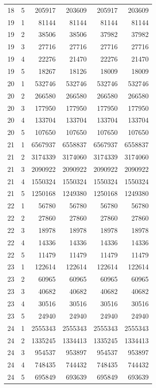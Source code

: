 \begin{longtable}{rrrrrr}
18 & 5 & 205917 & 203609 & 205917 & 203609 \\
19 & 1 & 81144 & 81144 & 81144 & 81144 \\
19 & 2 & 38506 & 38506 & 37982 & 37982 \\
19 & 3 & 27716 & 27716 & 27716 & 27716 \\
19 & 4 & 22276 & 21470 & 22276 & 21470 \\
19 & 5 & 18267 & 18126 & 18009 & 18009 \\
20 & 1 & 532746 & 532746 & 532746 & 532746 \\
20 & 2 & 266580 & 266580 & 266580 & 266580 \\
20 & 3 & 177950 & 177950 & 177950 & 177950 \\
20 & 4 & 133704 & 133704 & 133704 & 133704 \\
20 & 5 & 107650 & 107650 & 107650 & 107650 \\
21 & 1 & 6567937 & 6558837 & 6567937 & 6558837 \\
21 & 2 & 3174339 & 3174060 & 3174339 & 3174060 \\
21 & 3 & 2090922 & 2090922 & 2090922 & 2090922 \\
21 & 4 & 1550324 & 1550324 & 1550324 & 1550324 \\
21 & 5 & 1250168 & 1249380 & 1250168 & 1249380 \\
22 & 1 & 56780 & 56780 & 56780 & 56780 \\
22 & 2 & 27860 & 27860 & 27860 & 27860 \\
22 & 3 & 18978 & 18978 & 18978 & 18978 \\
22 & 4 & 14336 & 14336 & 14336 & 14336 \\
22 & 5 & 11479 & 11479 & 11479 & 11479 \\
23 & 1 & 122614 & 122614 & 122614 & 122614 \\
23 & 2 & 60965 & 60965 & 60965 & 60965 \\
23 & 3 & 40682 & 40682 & 40682 & 40682 \\
23 & 4 & 30516 & 30516 & 30516 & 30516 \\
23 & 5 & 24940 & 24940 & 24940 & 24940 \\
24 & 1 & 2555343 & 2555343 & 2555343 & 2555343 \\
24 & 2 & 1335245 & 1334413 & 1335245 & 1334413 \\
24 & 3 & 954537 & 953897 & 954537 & 953897 \\
24 & 4 & 748435 & 744432 & 748435 & 744432 \\
24 & 5 & 695849 & 693639 & 695849 & 693639 \\

\end{longtable}
